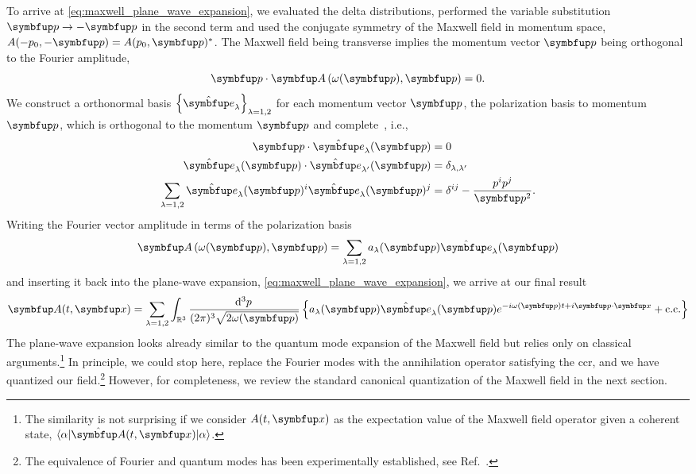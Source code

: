 To arrive at \cref{eq:maxwell_plane_wave_expansion}, we evaluated the delta distributions, performed the variable substitution $\vb{p}\to-\vb{p}$ in the second term and used the conjugate symmetry of the Maxwell field in momentum space, $A(-p_0,-\vb{p})=A(p_0,\vb{p})^*$.
The Maxwell field being transverse implies the momentum vector $\vb{p}$ being orthogonal to the Fourier amplitude,
\begin{equation}
	\vb{p}
	\vdot
	\vb{A}\left(\omega(\vb{p}),\vb{p}\right)
	=
	0
	.
\end{equation}
We construct a orthonormal basis $\left\{\vu{e}_\lambda\right\}_{\lambda=1,2}$ for each momentum vector $\vb{p}$, the polarization basis to momentum $\vb{p}$, which is orthogonal to the momentum $\vb{p}$ and complete~\cite[p.~341]{Srednicki2007}, i.e.,
\begin{align}
	\vb{p}
	\vdot
	\vu{e}_\lambda(\vb{p})
	&=
	0
	\\
	\vu{e}_\lambda(\vb{p})
	\vdot
	\vu{e}_{\lambda^\prime}(\vb{p})
	&=
	\delta_{\lambda,\lambda^\prime}
	\\
	\sum_{\lambda=1,2}
	\vu{e}_\lambda(\vb{p})^i
	\vu{e}_\lambda(\vb{p})^j
	&=
	\delta^{ij}
	-
	\frac{p^ip^j}{\vb{p}^2}
	.
\end{align}
Writing the Fourier vector amplitude in terms of the polarization basis
\begin{equation}
	\vb{A}\left(\omega(\vb{p}),\vb{p}\right)
	=
	\sum_{\lambda=1,2}
	a_\lambda(\vb{p})
	\vu{e}_\lambda(\vb{p})
\end{equation}
and inserting it back into the plane-wave expansion, \cref{eq:maxwell_plane_wave_expansion}, we arrive at our final result
\begin{equation}
	\vb{A}(t,\vb{x})
	=
	\sum_{\lambda=1,2}
	\int_{\mathbb{R}^3}\frac{\dd[3]{p}}{(2\pi)^3\sqrt{2\omega(\vb{p})}}
	\left\{
		a_\lambda(\vb{p})
		\vu{e}_\lambda(\vb{p})
		e^{-i\omega(\vb{p})t+i\vb{p}\vdot\vb{x}}
		+
		\text{c.c.}
	\right\}
	\label{eq:maxwell_expansion}
\end{equation}
The plane-wave expansion looks already similar to the quantum mode expansion of the Maxwell field but relies only on classical arguments.\footnote{The similarity is not surprising if we consider $A(t,\vb{x})$ as the expectation value of the Maxwell field operator given a coherent state, $\bra{\alpha}\vu{A}(t,\vb{x})\ket{\alpha}$.}
In principle, we could stop here, replace the Fourier modes with the annihilation operator satisfying the \gls{ccr}, and we have quantized our field.\footnote{The equivalence of Fourier and quantum modes has been experimentally established, see Ref.~\cite{Hulet1985}.}
However, for completeness, we review the standard canonical quantization of the Maxwell field in the next section.

